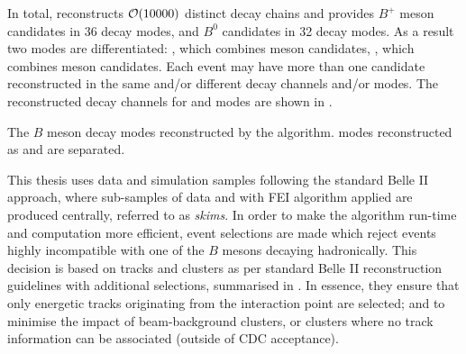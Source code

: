 In total, \FEI reconstructs ${\cal O}(10000)$ distinct decay chains and provides $B^+$ meson candidates in 36 decay modes, and $B^0$ candidates in 32 decay modes.
As a result two \FEI modes are differentiated: 
\feiBp, which combines \Bpm meson candidates,
\feiBz, which combines \Bz meson candidates.
Each event may have more than one candidate reconstructed in the same and/or different decay channels and/or \FEI modes.
The reconstructed decay channels for \feiBp and \feiBz modes are shown in .

\begin{table}
    \centering
    \caption{\label{tab:fei_modes}
    The $B$ meson decay modes reconstructed by the \FEI algorithm.
    \FEI modes reconstructed as \feiBp and \feiBz are separated.
    }
    
\end{table}


This thesis uses data and simulation samples following the standard Belle II approach, where sub-samples of data and \MC with FEI algorithm applied are produced centrally, referred to as \textit{\FEI skims}.
In order to make the \FEI algorithm run-time and computation more efficient, event selections are made which reject events highly incompatible with one of the $B$ mesons decaying hadronically.
This decision is based on tracks and clusters as per standard Belle II reconstruction guidelines with additional selections, summarised in .
In essence, they ensure that only energetic tracks originating from the interaction point are selected;
and to minimise the impact of beam-background clusters, or clusters where no track information can be associated (outside of CDC acceptance).

\begin{table}[htbp!]
    \centering
     \caption{\label{tab:fei_objects} Definitions for objects used in \FEI selections.}
\end{table}

